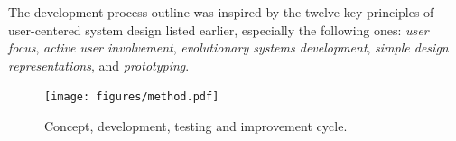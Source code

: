 
The development process outline was inspired by the
twelve key-principles of user-centered system design
listed earlier, especially the following ones:
\textit{user focus},
\textit{active user involvement},
\textit{evolutionary systems development},
\textit{simple design representations},
and
\textit{prototyping}.


\begin{figure}[h!]
  \centering
  \texttt{[image: figures/method.pdf]}
  \caption{Concept, development, testing and improvement cycle.}
\end{figure}


